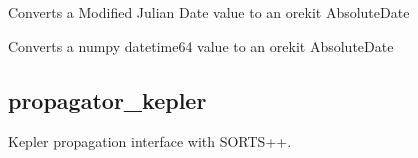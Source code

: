 \documentclass[letterpaper,10pt,english]{sphinxmanual}
\begin{document}

\begin{fulllineitems}
\label{\detokenize{modules/propagator_orekit:propagator_orekit.iter_states}}
\end{fulllineitems}


\begin{fulllineitems}
\label{\detokenize{modules/propagator_orekit:propagator_orekit.mjd2absdate}}
Converts a Modified Julian Date value to an orekit AbsoluteDate

\end{fulllineitems}


\begin{fulllineitems}
\label{\detokenize{modules/propagator_orekit:propagator_orekit.npdt2absdate}}
Converts a numpy datetime64 value to an orekit AbsoluteDate

\end{fulllineitems}



\subsection{propagator\_kepler}
\label{\detokenize{modules/propagator_kepler:module-propagator_kepler}}\label{\detokenize{modules/propagator_kepler:propagator-kepler}}\label{\detokenize{modules/propagator_kepler::doc}}
Kepler propagation interface with SORTS++.
\end{document}
